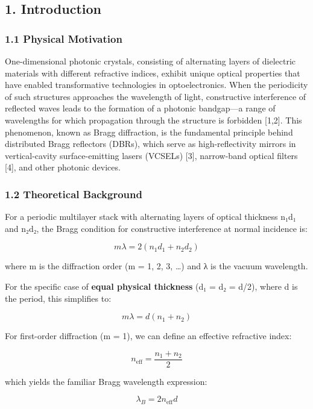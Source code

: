 \documentclass[
]{article}
\begin{document}
\subsection{1. Introduction}\label{introduction}

\subsubsection{1.1 Physical Motivation}\label{physical-motivation}

One-dimensional photonic crystals, consisting of alternating layers of
dielectric materials with different refractive indices, exhibit unique
optical properties that have enabled transformative technologies in
optoelectronics. When the periodicity of such structures approaches the
wavelength of light, constructive interference of reflected waves leads
to the formation of a photonic bandgap---a range of wavelengths for
which propagation through the structure is forbidden {[}1,2{]}. This
phenomenon, known as Bragg diffraction, is the fundamental principle
behind distributed Bragg reflectors (DBRs), which serve as
high-reflectivity mirrors in vertical-cavity surface-emitting lasers
(VCSELs) {[}3{]}, narrow-band optical filters {[}4{]}, and other
photonic devices.

\subsubsection{1.2 Theoretical Background}\label{theoretical-background}

For a periodic multilayer stack with alternating layers of optical
thickness n₁d₁ and n₂d₂, the Bragg condition for constructive
interference at normal incidence is:

\[m\lambda = 2(n_1 d_1 + n_2 d_2)\]

where m is the diffraction order (m = 1, 2, 3, \ldots) and λ is the
vacuum wavelength.

For the specific case of \textbf{equal physical thickness} (d₁ = d₂ =
d/2), where d is the period, this simplifies to:

\[m\lambda = d(n_1 + n_2)\]

For first-order diffraction (m = 1), we can define an effective
refractive index:

\[n_{\text{eff}} = \frac{n_1 + n_2}{2}\]

which yields the familiar Bragg wavelength expression:

\[\lambda_B = 2n_{\text{eff}}d\]
\end{document}
